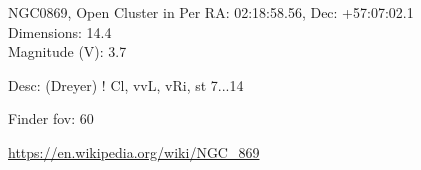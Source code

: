 \begin{block}{NGC0869, Open Cluster in Per}
    RA: 02:18:58.56, Dec: +57:07:02.1 \\ 
    Dimensions: 14.4 \\ 
    Magnitude (V): 3.7


    Desc: (Dreyer) ! Cl, vvL, vRi, st 7...14 

    Finder fov: 60 

    \url{https://en.wikipedia.org/wiki/NGC_869} 
\end{block}